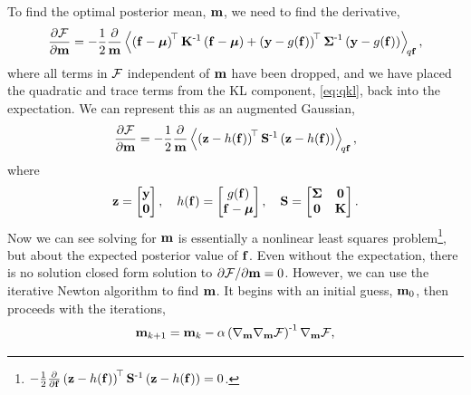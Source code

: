 \documentclass{article} %
\begin{document}
To find the optimal posterior mean, $\pomean$, we need to find the derivative,
\begin{equation}
    \frac{\partial\Fengy}{\partial\pomean} = -\frac{1}{2}
    \frac{\partial}{\pomean} \expec{q\lstate}{
        \brac{\lstate - \prmean}\transpose\prcov\inv
        \brac{\lstate - \prmean}
        + \brac{\obs - \nonlin{\lstate}}\transpose \lcov\inv
            \brac{\obs - \nonlin{\lstate}}},
\end{equation}
where all terms in $\Fengy$ independent of $\pomean$ have been dropped, and we
have placed the quadratic and trace terms from the KL component,
\eqref{eq:qkl}, back into the expectation. We can represent this as an
augmented Gaussian,
\begin{equation}
    \frac{\partial\Fengy}{\partial\pomean} = -\frac{1}{2}
        \frac{\partial}{\pomean}
        \expec{q\lstate}{
        \brac{\augobs - \augnonlin{\lstate}}\transpose\augcov\inv
        \brac{\augobs - \augnonlin{\lstate}}
    },
    \label{eq:augsys}
\end{equation}
where
\begin{equation}
    \augobs = \begin{bmatrix} \obs \\ \mathbf{0} \end{bmatrix}, \quad
    \augnonlin{\lstate} = \begin{bmatrix} \nonlin{\lstate} \\ \lstate - \prmean 
        \end{bmatrix}, \quad
    \augcov = \begin{bmatrix} \lcov & \mathbf{0} \\ \mathbf{0} & \prcov 
        \end{bmatrix}.
\end{equation}
Now we can see solving for $\pomean$ is essentially a nonlinear least squares 
problem\footnote{$-\frac{1}{2}
        \frac{\partial}{\partial\lstate}
        \brac{\augobs - \augnonlin{\lstate}}\transpose\augcov\inv
        \brac{\augobs - \augnonlin{\lstate}} = 0$.}, but about
the expected posterior value of $\lstate$. Even without the expectation, there
is no solution closed form solution to $\partial\Fengy/\partial\pomean = 0$.
However, we can use the iterative Newton algorithm to find $\pomean$. It begins
with an initial guess, $\pomean_0$, then proceeds with the iterations,
\begin{equation}
    \pomean_{k+1} = \pomean_k -
    \step\brac{\nabla_\pomean\nabla_\pomean\Fengy}\inv \nabla_\pomean\Fengy,
    \label{eq:newton}
\end{equation}
\end{document}
